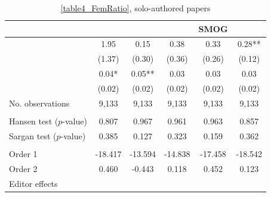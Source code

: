 \begin{table}
    \footnotesize
    \centering
    \begin{threeparttable}
        \caption{\autoref{table4_FemRatio}, solo-authored papers}
        \label{table4_FemSolo}
        \begin{tabular}{p{4cm}S@{}S@{}S@{}S@{}S@{}}
            \toprule
            &{}&{}&{}&{SMOG}&{}\\
            \midrule
            &        1.95   &        0.15   &        0.38   &        0.33   &        0.28** \\
                                          &      {(1.37)}   &      {(0.30)}   &      {(0.36)}   &      {(0.26)}   &      {(0.12)}   \\
            &        0.04*  &        0.05** &        0.03   &        0.03   &        0.03   \\
                                          &      {(0.02)}   &      {(0.02)}   &      {(0.02)}   &      {(0.02)}   &      {(0.02)}   \\
            \midrule
            No. observations      &       9,133   &       9,133   &       9,133   &       9,133   &       9,133   \\
             \\\quad Hansen test (\(p\)-value)&       0.807   &       0.967   &       0.961   &       0.963   &       0.857   \\
            \quad Sargan test (\(p\)-value)&       0.385   &       0.127   &       0.323   &       0.159   &       0.362   \\
             \\\quad Order 1&     -18.417   &     -13.594   &     -14.838   &     -17.458   &     -18.542   \\
            \quad Order 2                 &       0.460   &      -0.443   &       0.118   &       0.452   &       0.123   \\
            \midrule
            Editor effects        &           {}   &           {}   &           {}   &           {}   &           {}   \\

\end{tabular}
\end{threeparttable}
\end{table}
